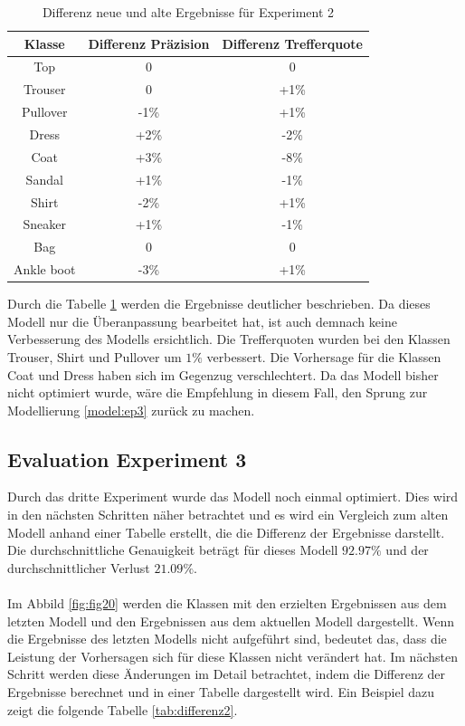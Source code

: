\documentclass[12pt]{scrreprt}
\begin{document}
\begin{table}[h!]
	\begin{center}
		\begin{tabular}{|c|c|c|}
			\hline
			Klasse & Differenz Präzision & Differenz Trefferquote \\
			\hline
			Top  & 0 & 0\\
			\hline
			Trouser  & 0 & +1\%  \\
			\hline
			Pullover   & -1\% & +1\% \\
			\hline
			Dress   & +2\% & -2\% \\
			\hline
			Coat   & +3\% & -8\% \\
			\hline
			Sandal & +1\% & -1\% \\
			\hline
			Shirt & -2\% & +1\% \\
			\hline
			Sneaker & +1\% & -1\% \\
			\hline
			Bag & 0 & 0 \\
			\hline
			Ankle boot & -3\% & +1\% \\
			\hline
		\end{tabular}
		\caption{Differenz neue und alte Ergebnisse für Experiment 2}
		\label{tab:differenz}
	\end{center}
\end{table}
\newpage
Durch die Tabelle \ref{tab:differenz} werden die Ergebnisse deutlicher beschrieben. Da dieses Modell nur die Überanpassung bearbeitet hat, ist auch demnach keine Verbesserung des Modells ersichtlich. Die Trefferquoten wurden bei den Klassen Trouser, Shirt und Pullover um $1\%$ verbessert. Die Vorhersage für die Klassen Coat und Dress haben sich im Gegenzug verschlechtert. Da das Modell bisher nicht optimiert wurde, wäre die Empfehlung in diesem Fall, den Sprung zur Modellierung \ref{model:ep3} zurück zu machen. 

\subsection{Evaluation Experiment 3}\label{eval:eval3}

Durch das dritte Experiment wurde das Modell noch einmal optimiert. Dies wird in den nächsten Schritten näher betrachtet und es wird ein Vergleich zum alten Modell anhand einer Tabelle erstellt, die die Differenz der Ergebnisse darstellt. Die durchschnittliche Genauigkeit beträgt für dieses Modell $92.97\%$ und der durchschnittlicher Verlust $21.09\%$.\\
\\
Im Abbild \ref{fig:fig20} werden die Klassen mit den erzielten Ergebnissen aus dem letzten Modell und den Ergebnissen aus dem aktuellen Modell dargestellt. Wenn die Ergebnisse des letzten Modells nicht aufgeführt sind, bedeutet das, dass die Leistung der Vorhersagen sich für diese Klassen nicht verändert hat. Im nächsten Schritt werden diese Änderungen im Detail betrachtet, indem die Differenz der Ergebnisse berechnet und in einer Tabelle dargestellt wird. Ein Beispiel dazu zeigt die folgende Tabelle \ref{tab:differenz2}.
\end{document}
